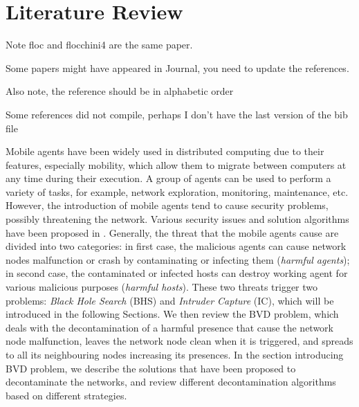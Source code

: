 \chapter {Literature Review}
\label{RW}


\color{blue}
Note {floc} and {flocchini4} are the same paper.

Some papers might have appeared in Journal, you need to update the references.

Also note, the reference should be in alphabetic order


Some references did not compile, perhaps I don't have the last version of the bib file

\color{black}
Mobile agents have been widely used in  distributed computing due to their features, especially   mobility, which allow them to migrate between computers at any time during their execution. A group of agents can be used to perform a variety of tasks, for example, network exploration, monitoring,  maintenance,   etc. However, the introduction of mobile agents tend to cause security problems, possibly  threatening the network. Various security issues and solution algorithms have been proposed  in \cite{security}. Generally, the threat  that the mobile agents cause are divided into two categories: in first case, the malicious agents can cause network nodes malfunction or crash by contaminating or infecting them ({\em harmful agents}); in second case, the contaminated or infected hosts can destroy working agent for various malicious purposes ({\em harmful hosts}). These two threats trigger two problems: {\em Black Hole Search } (BHS) and {\em Intruder Capture} (IC), which will be introduced in the following Sections. We then  review the BVD problem, which deals with the decontamination of a harmful presence that cause the network node malfunction, leaves the network node clean when it is triggered, and spreads to all its neighbouring nodes increasing its presences. In the section introducing BVD problem, we describe the solutions that have been proposed to decontaminate the networks, and review different decontamination algorithms based on different strategies.

